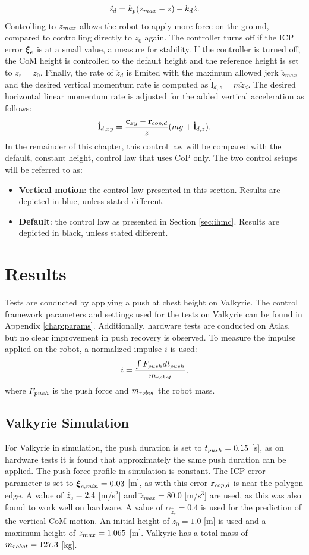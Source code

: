 \begin{equation}
	\ddot{z}_d = k_p(z_{max}-z)-k_d\dot{z}.
\end{equation}
Controlling to $z_{max}$ allows the robot to apply more force on the ground, compared to controlling directly to $z_0$ again. The controller turns off if the \ac{ICP} error $\boldsymbol{\xi}_e$ is at a small value, a measure for stability. If the controller is turned off, the \ac{CoM} height is controlled to the default height and the reference height is set to $z_r=z_0$. Finally, the rate of $\ddot{z}_d$ is limited with the maximum allowed jerk $\dddot{z}_{max}$ and the desired vertical momentum rate is computed as $\dot{\mathbf{l}}_{d,z}=m\ddot{z}_d$. The desired horizontal linear momentum rate is adjusted for the added vertical acceleration as follows:
\begin{equation}
    \dot{\mathbf{l}}_{d,xy}= \frac{\mathbf{c}_{xy}-\mathbf{r}_{cop,d}}{z}(mg+\dot{\mathbf{l}}_{d,z}).
\end{equation}
In the remainder of this chapter, this control law will be compared with the default, constant height, control law that uses \ac{CoP} only. The two control setups will be referred to as:
\begin{itemize}
\item \textbf{Vertical motion}: the control law presented in this section. Results are depicted in blue, unless stated different.
\item \textbf{Default}: the control law as presented in Section \ref{sec:ihmc}. Results are depicted in black, unless stated different.
\end{itemize}
\section{Results}
Tests are conducted by applying a push at chest height on Valkyrie. The control framework parameters and settings used for the tests on Valkyrie can be found in Appendix \ref{chap:params}. Additionally, hardware tests are conducted on Atlas, but no clear improvement in push recovery is observed. To measure the impulse applied on the robot, a normalized impulse $i$ is used:
\begin{equation}
	i = \frac{\int F_{push} dt_{push}}{m_{robot}},
\end{equation}
where $F_{push}$ is the push force and $m_{robot}$ the robot mass.
\subsection{Valkyrie Simulation}
For Valkyrie in simulation, the push duration is set to $t_{push}=0.15$ [s], as on hardware tests it is found that approximately the same push duration can be applied. The push force profile in simulation is constant. The \ac{ICP} error parameter is set to $\boldsymbol{\xi}_{e,min}=0.03$ [m], as with this error $\mathbf{r}_{cop,d}$ is near the polygon edge. A value of $\ddot{z}_{c}=2.4$ [m/s$^2$] and $\dddot{z}_{max}=80.0$ [m/s$^3$] are used, as this was also found to work well on hardware. A value of $\alpha_{\hat{\ddot{z}}_{c}}=0.4$ is used for the prediction of the vertical \ac{CoM} motion. An initial height of $z_0=1.0$ [m] is used and a maximum height of $z_{max}=1.065$ [m]. Valkyrie has a total mass of $m_{robot}=127.3$ [kg]. 

